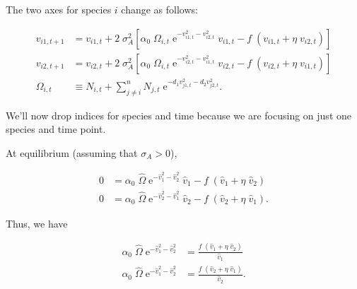 The two axes for species $i$ change as follows:

\begin{equation*}
\begin{split}
    v_{i1,t+1} &= v_{i1,t} + 2 \; \sigma_A^2
    \left[
        \alpha_0 \; \Omega_{i,t} \;
            \textrm{e}^{-v_{i1,t}^2 - v_{i2,t}^2} \; v_{i1,t}
        - f \; ( v_{i1,t} + \eta \; v_{i2,t} )
    \right] \\
    v_{i2,t+1} &= v_{i2,t} + 2 \; \sigma_A^2
    \left[
        \alpha_0 \; \Omega_{i,t} \;
            \textrm{e}^{-v_{i2,t}^2 - v_{i1,t}^2} \; v_{i2,t}
        - f \; ( v_{i2,t} + \eta \; v_{i1,t} )
    \right] \\
    \Omega_{i,t} &\equiv N_{i,t} +
        \sum_{j \ne i}^{n}{ N_{j,t} \; \textrm{e}^{
                - d_1 v_{j1,t}^2 - d_2 v_{j2,t}^2 } }
    \textrm{.}
\end{split}
\end{equation*}


We'll now drop indices for species and time because we are
focusing on just one species and time point.



At equilibrium (assuming that $\sigma_A > 0$),

\begin{equation}
\begin{split}
    0 &= \alpha_0 \; \hat{\Omega} \;
            \textrm{e}^{-\hat{v}_{1}^2 - \hat{v}_{2}^2} \; \hat{v}_{1}
        - f \; ( \hat{v}_{1} + \eta \; \hat{v}_{2} ) \\
    0 &=
        \alpha_0 \; \hat{\Omega} \;
            \textrm{e}^{-\hat{v}_{2}^2 - \hat{v}_{1}^2} \; \hat{v}_{2}
        - f \; ( \hat{v}_{2} + \eta \; \hat{v}_{1} )
    \textrm{.}
\end{split}
\label{eq:two-axes-v-eq1}
\end{equation}


\noindent Thus, we have

\begin{equation*}
\begin{split}
    \alpha_0 \; \hat{\Omega} \; \textrm{e}^{-\hat{v}_{1}^2 - \hat{v}_{2}^2} &=
        \frac{ f \; ( \hat{v}_{1} + \eta \; \hat{v}_{2} ) }{ \hat{v}_{1} } \\
    \alpha_0 \; \hat{\Omega} \; \textrm{e}^{-\hat{v}_{1}^2 - \hat{v}_{2}^2} &=
        \frac{ f \; ( \hat{v}_{2} + \eta \; \hat{v}_{1} ) }{ \hat{v}_{2} }
    \textrm{.}
\end{split}
\end{equation*}


